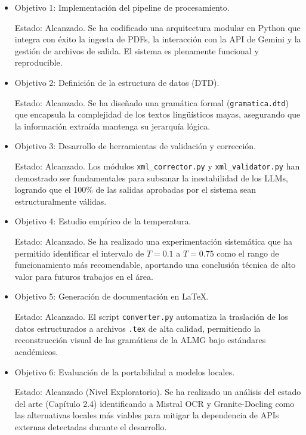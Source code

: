 \begin{itemize}
    \item Objetivo 1: Implementación del pipeline de procesamiento.

    Estado: Alcanzado. Se ha codificado una arquitectura modular en Python que integra con éxito la ingesta de PDFs, la interacción con la API de Gemini y la gestión de archivos de salida. El sistema es plenamente funcional y reproducible.

    \item Objetivo 2: Definición de la estructura de datos (DTD).

    Estado: Alcanzado. Se ha diseñado una gramática formal (\texttt{gramatica.dtd}) que encapsula la complejidad de los textos lingüísticos mayas, asegurando que la información extraída mantenga su jerarquía lógica.

    \item Objetivo 3: Desarrollo de herramientas de validación y corrección.

    Estado: Alcanzado. Los módulos \texttt{xml\_corrector.py} y \texttt{xml\_validator.py} han demostrado ser fundamentales para subsanar la inestabilidad de los LLMs, logrando que el 100\% de las salidas aprobadas por el sistema sean estructuralmente válidas.

    \item Objetivo 4: Estudio empírico de la temperatura.

    Estado: Alcanzado. Se ha realizado una experimentación sistemática que ha permitido identificar el intervalo de \(T=0.1\) a \(T=0.75\) como el rango de funcionamiento más recomendable, aportando una conclusión técnica de alto valor para futuros trabajos en el área.
    
    \item Objetivo 5: Generación de documentación en LaTeX.

    Estado: Alcanzado. El script \texttt{converter.py} automatiza la traslación de los datos estructurados a archivos \texttt{.tex} de alta calidad, permitiendo la reconstrucción visual de las gramáticas de la ALMG bajo estándares académicos.

    \item Objetivo 6: Evaluación de la portabilidad a modelos locales.

    Estado: Alcanzado (Nivel Exploratorio). Se ha realizado un análisis del estado del arte (Capítulo 2.4) identificando a Mistral OCR y Granite-Docling como las alternativas locales más viables para mitigar la dependencia de APIs externas detectadas durante el desarrollo.
\end{itemize}

